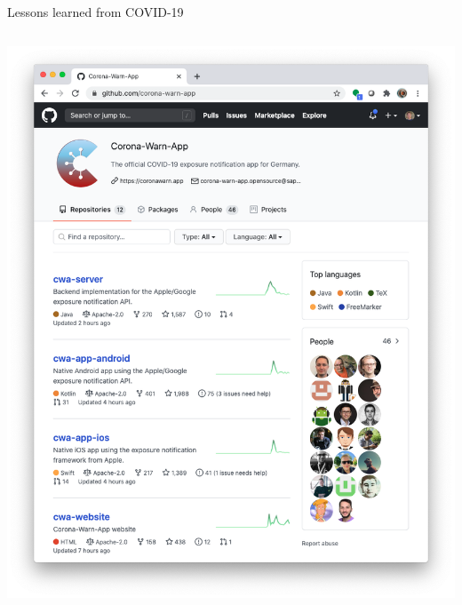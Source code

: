 \begin{frame}{Lessons learned from COVID-19}
\begin{columns}[t]
\begin{column}{.4\textwidth}
        \centering
        \includegraphics[width=\textwidth]{images/Corona-warn-app.png}\\
        
        \label{fig:my_label}
    \end{column}
    

\end{columns}

\end{frame}